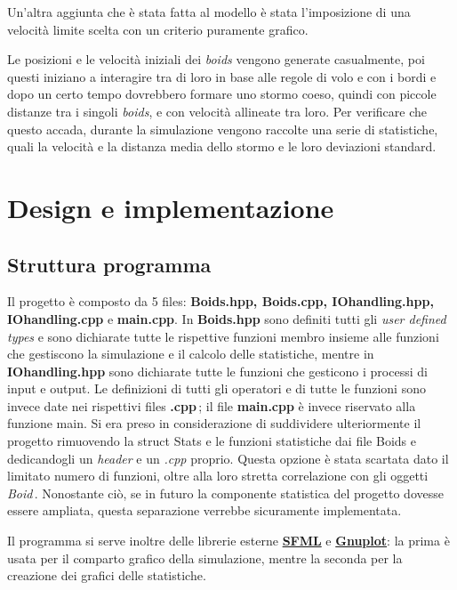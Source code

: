 \documentclass{article}
\begin{document}
Un'altra aggiunta che è stata fatta al modello è stata l'imposizione di una velocità limite scelta con un criterio puramente grafico. 


Le posizioni e le velocità iniziali dei \textit{boids} vengono generate casualmente, poi questi iniziano a interagire tra di loro in base alle regole di volo e con i bordi e dopo un certo tempo dovrebbero formare uno stormo coeso, quindi con piccole distanze tra i singoli \textit{boids}, e con velocità allineate tra loro. Per verificare che questo accada, durante la simulazione vengono raccolte una serie di statistiche, quali la velocità e la distanza media dello stormo e le loro deviazioni standard.

\section{Design e implementazione}

\subsection{Struttura programma}

Il progetto è composto da 5 files: \textbf{Boids.hpp, Boids.cpp, IO\textunderscore handling.hpp, IO\textunderscore handling.cpp} e \textbf{
main.cpp}. In \textbf{Boids.hpp} sono definiti tutti gli \textit{user defined types} e sono dichiarate tutte le rispettive funzioni membro insieme alle funzioni che gestiscono la simulazione e il calcolo delle statistiche, mentre in \textbf{IO\textunderscore handling.hpp} sono dichiarate tutte le funzioni che gesticono i processi di input e output. Le definizioni di tutti gli operatori e di tutte le funzioni sono invece date nei rispettivi files \textbf{.cpp}\,; il file \textbf{main.cpp} è invece riservato alla funzione main. Si era preso in considerazione di suddividere ulteriormente il progetto rimuovendo la struct Stats e le funzioni statistiche dai file Boids e dedicandogli un \textit{header} e un \textit{.cpp} proprio. Questa opzione è stata scartata dato il limitato numero di funzioni, oltre alla loro stretta correlazione con gli oggetti \textit{Boid}\,. Nonostante ciò, se in futuro la componente statistica del progetto dovesse essere ampliata, questa separazione verrebbe sicuramente implementata.

Il programma si serve inoltre delle librerie esterne \href{https://www.sfml-dev.org/}{\textbf{SFML}} e \href{http://www.gnuplot.info/}{\textbf{Gnuplot}}: la prima è usata per il comparto grafico della simulazione, mentre la seconda per la creazione dei grafici delle statistiche.
\end{document}
